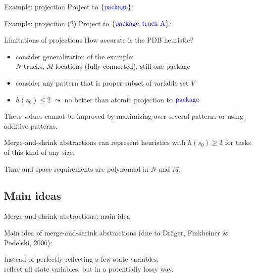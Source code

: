 \documentclass{gkibeamer}
\begin{document}
\begin{frame}{Example: projection}
  Project to $\{\text{{\color{blue} package}}\}$:
  \begin{center}
    \picprojectionpackage
  \end{center}
\end{frame}

\begin{frame}{Example: projection (2)}
   Project to $\{\text{{\color{blue} package}},
   \text{{\color{blue} truck A}}\}$:
   \begin{center}
     \picprojectionpackagetruck
   \end{center}
\end{frame}

\begin{frame}{Limitations of projections}
  How accurate is the PDB heuristic?
  \begin{itemize}
  \item consider \alert{generalization of the example}: \\
    $N$ trucks, $M$ locations (fully connected), still one package
  \item consider \alert{any} pattern that is proper subset of
    variable set $V$
  \item $h(s_0) \le 2$ $\leadsto$ \alert{no better} than atomic
    projection to $\text{{\color{blue} package}}$
  \end{itemize}

  \bigskip

  These values cannot be improved by maximizing over several patterns
  or using additive patterns.

  \bigskip

  \alert{Merge-and-shrink abstractions} can represent heuristics with
  $h(s_0) \ge 3$ for tasks of this kind of any size.

  Time and space requirements are \alert{polynomial in $N$ and $M$}.
\end{frame}

\subsection{Main ideas}

\begin{frame}{Merge-and-shrink abstractions: main idea}
  \begin{block}{Main idea of merge-and-shrink abstractions}
    (due to Dr\"ager, Finkbeiner \& Podelski, 2006): \medskip

    Instead of \alert{perfectly} reflecting \alert{a few} state
    variables, \\
    reflect \alert{all} state variables, but in a \alert{potentially
      lossy} way.
  \end{block}
\end{frame}
\end{document}
